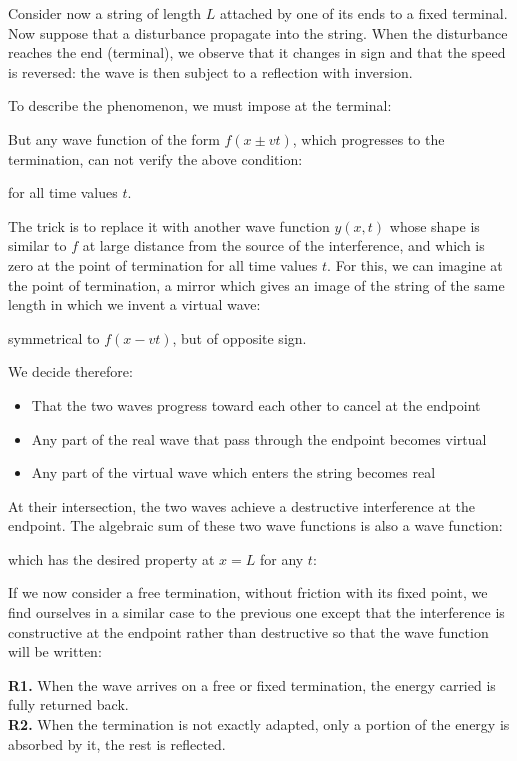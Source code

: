 	Consider now a string of length $L$ attached by one of its ends to a fixed terminal. Now suppose that a disturbance propagate into the string. When the disturbance reaches the end (terminal), we observe that it changes in sign and that the speed is reversed: the wave is then subject to a reflection with inversion.
	
	To describe the phenomenon, we must impose at the terminal:
	
	But any wave function of the form $f(x\pm vt)$, which progresses to the termination, can not verify the above condition:
	
	for all time values $t$.
	
	The trick is to replace it with another wave function $y(x, t)$ whose shape is similar to $f$ at large distance from the source of the interference, and which is zero at the point of termination for all time values $t$. For this, we can imagine at the point of termination, a mirror which gives an image of the string of the same length in which we invent a virtual wave:
	
	symmetrical to $f(x-vt)$, but of opposite sign.
	
	We decide therefore:
	\begin{itemize}
		\item That the two waves progress toward each other to cancel at the endpoint
		\item Any part of the real wave that pass through the endpoint becomes virtual
		
		\item Any part of the virtual wave which enters the string  becomes real
	\end{itemize}
	At their intersection, the two waves achieve a destructive interference at the endpoint. The algebraic sum of these two wave functions is also a wave function:
	
	which has the desired property at $x = L$ for any $t$:
	
	If we now consider a free termination, without friction with its fixed point, we find ourselves in a similar case to the previous one except that the interference is constructive at the endpoint rather than destructive so that the wave function will be written:
	
	\begin{tcolorbox}[title=Remarks,colframe=black,arc=10pt]
	\textbf{R1.} When the wave arrives on a free or fixed termination, the energy carried is fully returned back.\\
	
	\textbf{R2.} When the termination is not exactly adapted, only a portion of the energy is absorbed by it, the rest is reflected.
	\end{tcolorbox}
	
